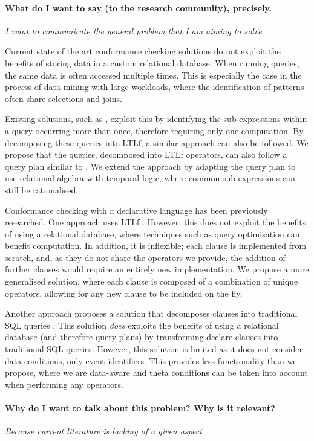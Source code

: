\paragraph*{What do I want to say (to the research community), precisely.} \textit{I want to communicate the general problem that I am aiming to solve} 

Current state of the art conformance checking solutions do not exploit the benefits of storing data in a custom relational database. When running queries, the same data is often accessed multiple times. This is especially the case in the process of data-mining with large workloads, where the identification of patterns often share selections and joins. 

Existing solutions, such as \cite{BellatrecheKB21}, exploit this by identifying the sub expressions within a query occurring more than once, therefore requiring only one computation. By decomposing these queries into LTLf, a similar approach can also be followed. We propose that the queries, decomposed into LTLf operators, can also follow a query plan similar to \cite{BellatrecheKB21}. We extend the approach by adapting the query plan to use relational algebra with temporal logic, where common sub expressions can still be rationalised.

Conformance checking with a declarative language has been previously researched. One approach uses LTLf \cite{BurattinMS16}. However, this does not exploit the benefits of using a relational database, where techniques such as query optimisation can benefit computation. In addition, it is inflexible; each clause is implemented from scratch, and, as they do not share the operators we provide, the addition of further clauses would require an entirely new implementation. We propose a more generalised solution, where each clause is composed of a combination of unique operators, allowing for any new clause to be included on the fly. 

Another approach proposes a solution that decomposes clauses into traditional SQL queries \cite{SchonigRCJM16}. This solution \emph{does} exploits the benefits of using a relational database (and therefore query plans) by transforming declare clauses into traditional SQL queries. However, this solution is limited as it does not consider data conditions, only event identifiers. This provides less functionality than we propose, where we are data-aware and theta conditions can be taken into account when performing any operators.

\paragraph*{Why do I want to talk about this problem? Why is it relevant?} \textit{Because current literature is lacking of a given aspect} 

